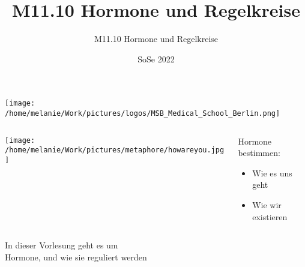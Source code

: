 \documentclass{beamer}
\title[M11.10 Hormone, Regelkreise]{M11.10 Hormone und Regelkreise}
\author[melanie.stefan@medicalschool-berlin.de]{M11.10 Hormone und Regelkreise}
\institute[]{Prof. Melanie Stefan - melanie.stefan@medcialschool-berlin.de}
\date{SoSe 2022}
\begin{document}
 
\begin{frame}

 \maketitle 

 
\vfill

\texttt{[image: /home/melanie/Work/pictures/logos/MSB\_Medical\_School\_Berlin.png]}

\end{frame} 




\begin{frame}

\begin{columns}[c]
\begin{column}{5cm}
\texttt{[image: /home/melanie/Work/pictures/metaphore/howareyou.jpg]}

\end{column}

\pause

\begin{column}{5cm}
Hormone bestimmen:

\begin{itemize}
\item
Wie es uns geht
\item
Wie wir existieren
\end{itemize}

\end{column}
\end{columns}

\end{frame}




{
\begin{frame}

$\,$\\[5cm]

\Large{In dieser Vorlesung geht es um \\Hormone, und wie sie reguliert werden}


\end{frame}
}


 
\end{document}
